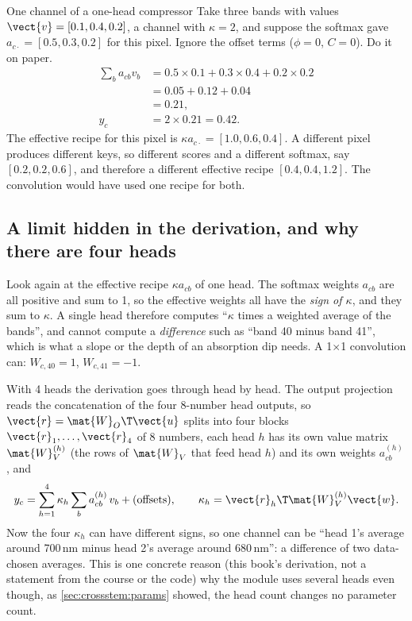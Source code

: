 \begin{worked}[label={we:crossstem:special}]{One channel of a one-head compressor}
Take three bands with values $\vect{v} = [0.1, 0.4, 0.2]$, a channel with $\kappa = 2$, and suppose the softmax gave $a_{c\cdot} = [0.5, 0.3, 0.2]$ for this pixel. Ignore the offset terms ($\phi = 0$, $C = 0$). Do it on paper.
\begin{align*}
  \sum_b a_{cb}v_b &= 0.5\times0.1 + 0.3\times0.4 + 0.2\times0.2\\
  &= 0.05 + 0.12 + 0.04\\
  &= 0.21,\\
  y_c &= 2\times0.21 = 0.42 .
\end{align*}
The effective recipe for this pixel is $\kappa a_{c\cdot} = [1.0, 0.6, 0.4]$. A different pixel produces different keys, so different scores and a different softmax, say $[0.2, 0.2, 0.6]$, and therefore a different effective recipe $[0.4, 0.4, 1.2]$. The convolution would have used one recipe for both.
\end{worked}

\subsection{A limit hidden in the derivation, and why there are four heads}\label{sec:crossstem:fourheads}

Look again at the effective recipe $\kappa a_{cb}$ of one head. The softmax weights $a_{cb}$ are all positive and sum to 1, so the effective weights all have the \emph{sign of $\kappa$}, and they sum to $\kappa$. A single head therefore computes ``$\kappa$ times a weighted average of the bands'', and cannot compute a \emph{difference} such as ``band 40 minus band 41'', which is what a slope or the depth of an absorption dip needs. A 1$\times$1 convolution can: $W_{c,40} = 1$, $W_{c,41} = -1$.

With 4 heads the derivation goes through head by head. The output projection reads the concatenation of the four 8-number head outputs, so $\vect{r} = \mat{W}_O\T\vect{u}$ splits into four blocks $\vect{r}_1, \ldots, \vect{r}_4$ of 8 numbers, each head $h$ has its own value matrix $\mat{W}_V^{(h)}$ (the rows of $\mat{W}_V$ that feed head $h$) and its own weights $a^{(h)}_{cb}$, and
\begin{equation}\label{eq:crossstem:fourhead}
  y_c = \sum_{h=1}^{4}\kappa_h\sum_b a^{(h)}_{cb}\,v_b + \text{(offsets)},\qquad \kappa_h = \vect{r}_h\T\mat{W}_V^{(h)}\vect{w}.
\end{equation}
Now the four $\kappa_h$ can have different signs, so one channel can be ``head 1's average around 700\,nm minus head 2's average around 680\,nm'': a difference of two data-chosen averages. This is one concrete reason (this book's derivation, not a statement from the course or the code) why the module uses several heads even though, as \cref{sec:crossstem:params} showed, the head count changes no parameter count.

